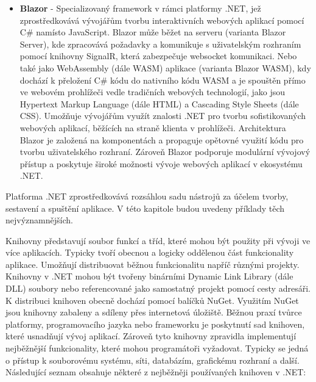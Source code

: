 \begin{itemize}
    \item \textbf{Blazor} - Specializovaný framework v rámci platformy .NET, jež zprostředkovává vývojářům tvorbu interaktivních webových aplikací pomocí C\# namísto JavaScript. Blazor může běžet na serveru (varianta Blazor Server), kde zpracovává požadavky a komunikuje s uživatelským rozhraním pomocí knihovny SignalR, která zabezpečuje websocket komunikaci. Nebo také jako WebAssembly (dále WASM) aplikace (varianta Blazor WASM), kdy dochází k přeložení C\# kódu do nativního kódu WASM a je spouštěn přímo ve webovém prohlížeči vedle tradičních webových technologií, jako jsou Hypertext Markup Language (dále HTML) a Cascading Style Sheets (dále CSS). \cite{Price2023c8} Umožňuje vývojářům využít znalosti .NET pro tvorbu sofistikovaných webových aplikací, běžících na straně klienta v prohlížeči. Architektura Blazor je založená na komponentách a propaguje opětovné využití kódu pro tvorbu uživatelského rozhraní. Zároveň Blazor podporuje modulární vývojový přístup a poskytuje široké možnosti vývoje webových aplikací v ekosystému .NET.
\end{itemize}


Platforma .NET zprostředkovává rozsáhlou sadu nástrojů za účelem tvorby, sestavení a spuštění aplikace. V této kapitole budou uvedeny příklady těch nejvýznamnějších.


Knihovny představují soubor funkcí a tříd, které mohou být použity při vývoji ve více aplikacích. Typicky tvoří obecnou a logicky oddělenou část funkcionality aplikace. Umožňují distribuovat běžnou funkcionalitu napříč různými projekty. \cite{Price2023c8}  Knihovny v .NET mohou být tvořeny binárními Dynamic Link Library (dále DLL) soubory nebo referencované jako samostatný projekt pomocí cesty adresáři. K distribuci knihoven obecně dochází pomocí balíčků NuGet. Využitím NuGet jsou knihovny zabaleny a sdíleny přes internetová úložiště. Běžnou praxí tvůrce platformy, programovacího jazyka nebo frameworku je poskytnutí sad knihoven, které usnadňují vývoj aplikací. Zároveň tyto knihovny zpravidla implementují nejběžnější funkcionality, které mohou programátoři vyžadovat. Typicky se jedná o přístup k souborovému systému, síti, databázím, grafickému rozhraní a další. Následující seznam obsahuje některé z nejběžněji používaných knihoven v .NET:

